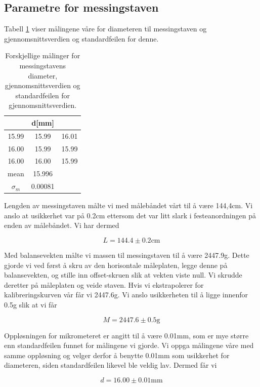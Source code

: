 \documentclass[a4paper,11pt, twocolumn]{article}
\begin{document}
\subsection{Parametre for messingstaven}
Tabell \ref{tab:diameter} viser målingene våre for diameteren til messingstaven og gjennomsnittsverdien og standardfeilen for denne.

\begin{table}[!ht]
\centering
\caption{Forskjellige målinger for messingstavens diameter, gjennomsnittsverdien og standardfeilen for gjennomsnittsverdien.}
\label{tab:diameter}
\begin{tabular}{ccc}
	\toprule
	\toprule
	 & d[mm]&\\
	\hline
	15.99 & 15.99 & 16.01\\
	16.00 & 15.99 & 15.99\\
	16.00 & 16.00 & 15.99\\
	\hline
	mean & 15.996 &\\
	$\sigma_m$ & 0.00081&\\
	\toprule
\end{tabular}
\end{table}

Lengden av messingstaven målte vi med målebåndet vårt til å være 144,4cm. Vi anslo at usikkerhet var på 0.2cm ettersom det var litt slark i festeanordningen på enden av målebåndet. Vi har dermed 

\begin{equation}
L=144.4\pm0.2\text{cm} 
\end{equation}

Med balansevekten målte vi massen til messingstaven til å være 2447.9g.  Dette gjorde vi ved først å skru av den horisontale måleplaten, legge denne på balansevekten, og stille inn offset-skruen slik at vekten viste null. Vi skrudde deretter på måleplaten og veide staven. Hvis vi ekstrapolerer for kalibreringskurven vår får vi 2447.6g. Vi anslo usikkerheten til å ligge innenfor 0.5g slik at vi får

\begin{equation}
	M = 2447.6\pm0.5\text{g}
\end{equation} 

Oppløsningen for mikrometeret er angitt til å være 0.01mm, som er mye større enn standardfeilen funnet for målingene vi gjorde. Vi oppga målingene våre med samme oppløsning og velger derfor å benytte 0.01mm som usikkerhet for diameteren, siden standardfeilen likevel ble veldig lav. Dermed får vi

\begin{equation}
	d = 16.00\pm0.01\text{mm}
\end{equation}
\end{document}
